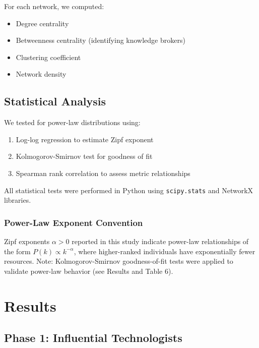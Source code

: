 \documentclass[11pt]{article}
\begin{document}
For each network, we computed:

\begin{itemize}
    \item Degree centrality
    \item Betweenness centrality (identifying knowledge brokers)
    \item Clustering coefficient
    \item Network density
\end{itemize}

\subsection{Statistical Analysis}

We tested for power-law distributions using:

\begin{enumerate}
    \item Log-log regression to estimate Zipf exponent
    \item Kolmogorov-Smirnov test for goodness of fit
    \item Spearman rank correlation to assess metric relationships
\end{enumerate}

All statistical tests were performed in Python using \texttt{scipy.stats} and NetworkX libraries.

\subsubsection{Power-Law Exponent Convention}

Zipf exponents $\alpha > 0$ reported in this study indicate power-law relationships of the form $P(k) \propto k^{-\alpha}$, where higher-ranked individuals have exponentially fewer resources. Note: Kolmogorov-Smirnov goodness-of-fit tests were applied to validate power-law behavior (see Results and Table 6).


\section{Results}

\subsection{Phase 1: Influential Technologists}
\end{document}
